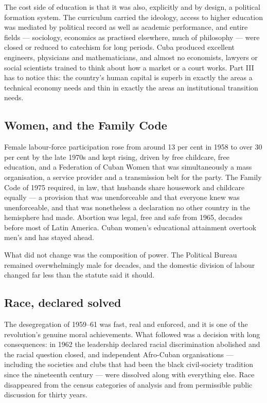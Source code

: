 The cost side of education is that it was also, explicitly and by design, a
political formation system. The curriculum carried the ideology, access to
higher education was mediated by political record as well as academic
performance, and entire fields --- sociology, economics as practised elsewhere,
much of philosophy --- were closed or reduced to catechism for long periods.
Cuba produced excellent engineers, physicians and mathematicians, and almost no
economists, lawyers or social scientists trained to think about how a market or
a court works. Part III has to notice this: the country's human capital is
superb in exactly the areas a technical economy needs and thin in exactly the
areas an institutional transition needs.

\subsection{Women, and the Family Code}

Female labour-force participation rose from around 13 per cent in 1958 to over
30 per cent by the late 1970s and kept rising, driven by free childcare, free
education, and a Federation of Cuban Women that was simultaneously a mass
organisation, a service provider and a transmission belt for the party. The
Family Code of 1975 required, in law, that husbands share housework and
childcare equally --- a provision that was unenforceable and that everyone knew
was unenforceable, and that was nonetheless a declaration no other country in
the hemisphere had made. Abortion was legal, free and safe from 1965, decades
before most of Latin America. Cuban women's educational attainment overtook
men's and has stayed ahead.

What did not change was the composition of power. The Political Bureau remained
overwhelmingly male for decades, and the domestic division of labour changed
far less than the statute said it should.

\subsection{Race, declared solved}

The desegregation of 1959--61 was fast, real and enforced, and it is one of the
revolution's genuine moral achievements. What followed was a decision with long
consequences: in 1962 the leadership declared racial discrimination abolished
and the racial question closed, and independent Afro-Cuban organisations ---
including the societies and clubs that had been the black civil-society
tradition since the nineteenth century --- were dissolved along with everything
else. Race disappeared from the census categories of analysis and from
permissible public discussion for thirty years.

